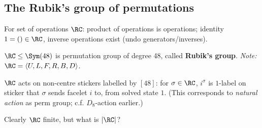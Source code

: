 




\subsection{The Rubik's group of permutations}

\begin{slide}
    For set of operations $\RC$: product of operations is operations; identity $1 = () \in \RC$, inverse operations exist (undo generators/inverses). \pause

    \begin{definition}
        \vspace{0pt}
        $\RC \leq \Sym(48)$ is permutation group of degree 48, called \textbf{Rubik's group}. \textit{Note:} $\RC = \langle U,L,F,R,B,D \rangle$.
    \end{definition} \pause

    $\RC$ acts on non-centre stickers labelled by $[48]$: for $\sigma \in \RC$, $i^\sigma$ is $1$-label on sticker that $\sigma$ sends facelet $i$ to, from solved state $1$. (This corresponds to \textit{natural action} as perm group; c.f. $D_8$-action earlier.) \pause

    Clearly $\RC$ finite, but what is $|\RC|$?
\end{slide}

